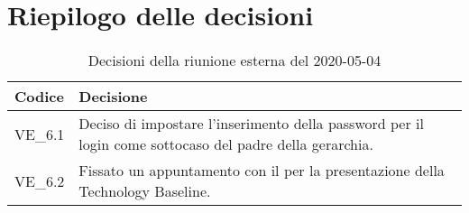 \section{Riepilogo delle decisioni}
\begin{longtable}{
	 >{\centering}p{} >{}p{} }
	\caption{Decisioni della riunione esterna del 2020-05-04}\\

	\textbf{\color{white}Codice} &
	\textbf{\color{white}Decisione}
	\tabularnewline
	\endhead

	VE\_6.1 & Deciso di impostare l'inserimento della password per il login come sottocaso del padre della gerarchia. \\
	VE\_6.2 & Fissato un appuntamento con il \RC{} per la presentazione della Technology Baseline\ped{\textit{G}}. \\
\end{longtable}
